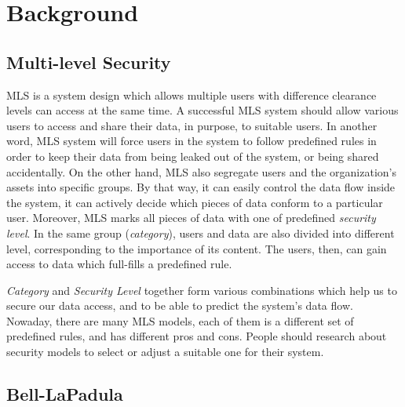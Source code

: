 
\chapter{Background} %

\label{ch:background} %


\section{Multi-level Security}

MLS is a system design which allows multiple users with difference clearance levels can access at the same time.
A successful MLS system should allow various users to access and share their data, in purpose, to suitable users. 
In another word, MLS system will force users in the system to follow predefined rules in order to keep their data from being leaked out of the system, or being shared accidentally.
On the other hand, MLS also segregate users and the organization's assets into specific groups.
By that way, it can easily control the data flow inside the system, it can actively decide which pieces of data conform to a particular user.
Moreover, MLS marks all pieces of data with one of predefined \emph{security level}.
In the same group (\emph{category}), users and data are also divided into different level, corresponding to the importance of its content.
The users, then, can gain access to data which full-fills a predefined rule.

\emph{Category} and \emph{Security Level} together form various combinations which help us to secure our data access, and to be able to predict the system's data flow.
Nowaday, there are many MLS models, each of them is a different set of predefined rules, and has different pros and cons.
People should research about security models to select or adjust a suitable one for their system.



\section{Bell-LaPadula}

